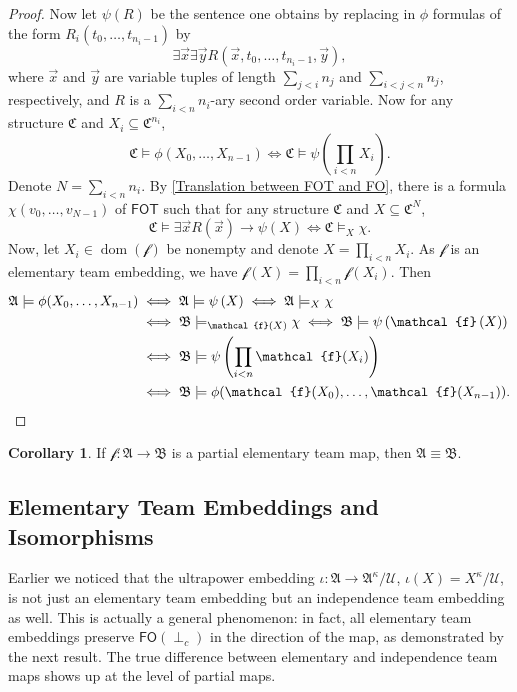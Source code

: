 \documentclass[a4paper]{amsart}
\theoremstyle{definition}
\newtheorem{corollary}[definition]{Corollary}
\theoremstyle{remark}
\newcommand{\A}{\mathcal{A}}
\newcommand{\B}{\mathcal{B}}
\newcommand{\C}{\mathcal{C}}
\newcommand{\U}{\mathcal{U}}
\newcommand{\vx}{\vec{x}}
\newcommand{\vy}{\vec{y}}
\DeclareMathOperator{\dom}{dom}
\newcommand\fot{\mathsf{FOT}}
\newcommand\foil{\mathsf{FO}(\perp_c)}
\theoremstyle{definition}
\renewcommand{\A}{\mathfrak{A}}
\renewcommand{\B}{\mathfrak{B}}
\renewcommand{\C}{\mathfrak{C}}
\newcommand{\f}{\mathcal{f}}
\begin{document}
\begin{proof}
    Now let $\psi(R)$ be the sentence one obtains by replacing in $\phi$ formulas of the form $R_i(t_0,\dots,t_{n_i-1})$ by
    \[
        \exists\vx\exists\vy R(\vx,t_0,\dots,t_{n_i-1},\vy),
    \]
    where $\vx$ and $\vy$ are variable tuples of length $\sum_{j<i}n_j$ and $\sum_{i<j<n}n_j$, respectively, and $R$ is a $\sum_{i<n}n_i$-ary second order variable. Now for any structure $\C$ and $X_i\subseteq\C^{n_i}$,
    \[
        \C\models\phi(X_0,\dots,X_{n-1}) \iff \C\models\psi\left(\prod_{i<n}X_i\right).
    \]
    Denote $N = \sum_{i<n}n_i$. By \cref{Translation between FOT and FO}, there is a formula $\chi(v_0,\dots,v_{N-1})$ of $\fot$ such that for any structure $\C$ and $X\subseteq\C^N$,
    \[
        \C\models\exists\vx R(\vx)\to \psi(X) \iff \C\models_X\chi.
    \]
    Now, let $X_i\in\dom(\f)$ be nonempty and denote $X=\prod_{i<n}X_i$. As $\f$ is an elementary team embedding, we have $\f(X) = \prod_{i<n}\f(X_i)$. Then
    \begin{align*}
        \A\models\phi(X_0,\dots,X_{n-1}) &\iff \A\models\psi\left(X\right) \iff \A\models_X\chi \\
        &\iff \B\models_{\f\left(X\right)}\chi \iff \B\models\psi\left(\f\left(X\right)\right) \\
        &\iff \B\models\psi\left(\prod_{i<n}\f(X_i)\right) \\
        &\iff \B\models\phi(\f(X_0),\dots,\f(X_{n-1})). \qedhere
    \end{align*}
\end{proof}

\begin{corollary}
    If $\f\colon\A\to\B$ is a partial elementary team map, then $\A\equiv\B$.
\end{corollary}



\subsection{Elementary Team Embeddings and Isomorphisms}

Earlier we noticed that the ultrapower embedding $\iota\colon\A\to\A^\kappa/\U$, $\iota(X)=X^\kappa/\U$, is not just an elementary team embedding but an independence team embedding as well. This is actually a general phenomenon: in fact, all elementary team embeddings preserve $\foil$ in the direction of the map, as demonstrated by the next result. The true difference between elementary and independence team maps shows up at the level of partial maps.
\end{document}
